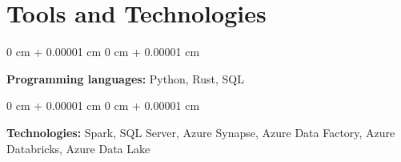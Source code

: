 \documentclass[10pt, letterpaper]{article}
\newenvironment{onecolentry}{
    \begin{adjustwidth}{
        0 cm + 0.00001 cm
    }{
        0 cm + 0.00001 cm
    }
}{
    \end{adjustwidth}
} %
\begin{document}
    
    \section{Tools and Technologies}



        
        \begin{onecolentry}
            \textbf{Programming languages:} Python, Rust, SQL
        \end{onecolentry}

        \vspace{0.2 cm}

        \begin{onecolentry}
            \textbf{Technologies:} Spark, SQL Server, Azure Synapse, Azure Data Factory, Azure Databricks, Azure Data Lake
        \end{onecolentry}

    
    
\end{document}
